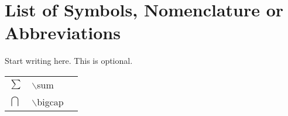 \chapter*{List of Symbols, Nomenclature or
Abbreviations}  Start
writing here. This is optional.
\begin{table}[!h]
\begin{tabular}{l l r}
$\sum$  &$\backslash$sum\\
$\bigcap$ &$\backslash$bigcap
\end{tabular}
\end{table}
